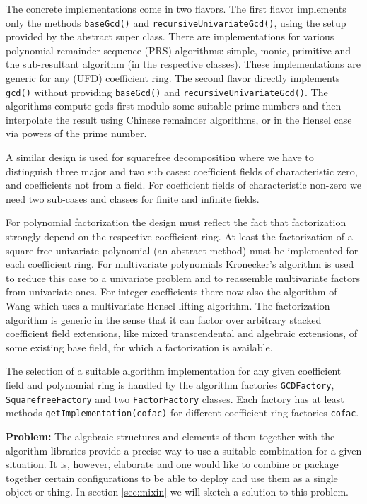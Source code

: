 \documentclass{llncs}
\newcommand{\code}[1]{\texttt{#1}}
\begin{document}
The concrete implementations come in two flavors.  The first flavor
implements only the methods \code{base\-Gcd()} and
\code{recursive\-Univariate\-Gcd()}, using the setup provided by the
abstract super class.  There are implementations for various
polynomial remainder sequence (PRS) algorithms: simple, monic,
primitive and the sub-resultant algorithm (in the respective classes).
These implementations are generic for any (UFD) coefficient ring.  The
second flavor directly implements \code{gcd()} without providing
\code{base\-Gcd()} and \code{recursive\-Univariate\-Gcd()}.  The
algorithms compute gcds first modulo some suitable prime numbers and
then interpolate the result using Chinese remainder algorithms, or in
the Hensel case via powers of the prime number.  

A similar design is used for squarefree decomposition where we have to
distinguish three major and two sub cases: coefficient fields of
characteristic zero, and coefficients not from a field. For
coefficient fields of characteristic non-zero we need two sub-cases
and classes for finite and infinite fields.

For polynomial factorization the design must reflect the fact that
factorization strongly depend on the respective coefficient ring.  At
least the factorization of a square-free univariate polynomial (an
abstract method) must be implemented for each coefficient ring.  For
multivariate polynomials Kronecker's algorithm is used to reduce this
case to a univariate problem and to reassemble multivariate factors
from univariate ones. For integer coefficients there now also the
algorithm of Wang which uses a multivariate Hensel lifting algorithm.
The factorization algorithm is generic in the sense that it can factor
over arbitrary stacked coefficient field extensions, like mixed
transcendental and algebraic extensions, of some existing base field,
for which a factorization is available.

The selection of a suitable algorithm implementation for any given
coefficient field and polynomial ring is handled by the
algorithm factories \code{GCD\-Factory}, \code{Squarefree\-Factory} and
two \code{Factor\-Factory} classes. Each factory has at least methods
\code{get\-Implemen\-tation(cofac)} for different coefficient ring
factories \code{cofac}.

{\bf Problem:} The algebraic structures and elements of them together
with the algorithm libraries provide a precise way to use a suitable
combination for a given situation. It is, however, elaborate and one
would like to combine or package together certain configurations to be
able to deploy and use them as a single object or thing. In section
\ref{sec:mixin} we will sketch a solution to this problem.
\end{document}
